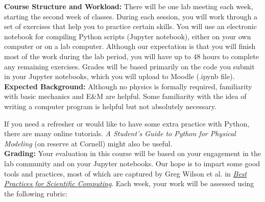 \documentclass[12pt,letterpaper]{article}
\begin{document}
\textbf {\large Course Structure and Workload:}
There will be one lab meeting each week, starting the second week of classes.  
During each session, you will work through a set of exercises that help you to practice certain skills.
You will use an electronic notebook for compiling Python scripts (Jupyter notebook), either on your own computer or on a lab computer.  
Although our expectation is that you will finish most of the work during the lab period, you will have up to 48 hours to complete any remaining exercises.
Grades will be based primarily on the code you submit in your Jupyter notebooks, which you will upload to Moodle (.ipynb file). \\

\textbf{\large Expected Background:} Although no physics is formally required, familiarity with basic mechanics and E\&M are helpful.  Some familiarity with the idea of writing a computer program is helpful but not absolutely necessary. 
\myparskip

If you need a refresher or would like to have some extra practice with Python, there are many online tutorials. 
\emph{A Student's Guide to Python for Physical Modeling} (on reserve at Cornell) might also be useful.\\

\textbf {\large Grading:}  
Your evaluation in this course will be based on your engagement in the lab community and on your Jupyter notebooks.  
Our hope is to impart some good tools and practices, most of which are captured by Greg Wilson et al. in \href{https://journals.plos.org/plosbiology/article?id=10.1371/journal.pbio.1001745#s1a}{\textit{Best Practices for Scientific Computing}}.
Each week, your work will be assessed using the following rubric:
\end{document}
